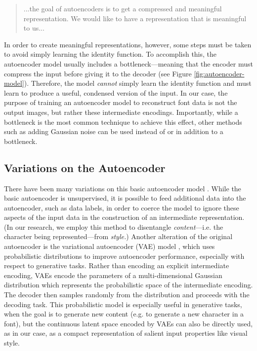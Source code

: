 \begin{quote}
    ...the goal of autoencoders is to get a compressed and meaningful
    representation. We would like to have a representation that is meaningful to us...
\end{quote}

In order to create meaningful representations, however, some steps must be taken to avoid simply learning the identity function. To accomplish this, the autoencoder model usually includes a bottleneck---meaning that the encoder must compress the input before giving it to the decoder (see Figure \ref{fig:autoencoder-model}). Therefore, the model \emph{cannot} simply learn the identity function and must learn to produce a useful, condensed version of the input. In our case, the purpose of training an autoencoder model to reconstruct font data is not the output images, but rather these intermediate encodings. Importantly, while a bottleneck is the most common technique to achieve this effect, other methods such as adding Gaussian noise \cite{bank2021autoencoders} can be used instead of or in addition to a bottleneck.

\subsection{Variations on the Autoencoder}

There have been many variations on this basic autoencoder model \cite{michelucci2022}. While the basic autoencoder is unsupervised, it is possible to feed additional data into the autoencoder, such as data labels, in order to coerce the model to ignore these aspects of the input data in the construction of an intermediate representation. (In our research, we employ this method to disentangle \textit{content}---i.e. the character being represented---from \textit{style.}) Another alteration of the original autoencoder is the variational autoencoder (VAE) model \cite{kingma2013}, which uses probabilistic distributions to improve autoencoder performance, especially with respect to generative tasks. Rather than encoding an explicit intermediate encoding, VAEs encode the parameters of a multi-dimensional Gaussian distribution which represents the probabilistic space of the intermediate encoding. The decoder then samples randomly from the distribution and proceeds with the decoding task. This probabilistic model is especially useful in generative tasks, when the goal is to generate new content (e.g. to generate a new character in a font), but the continuous latent space encoded by VAEs can also be directly used, as in our case, as a compact representation of salient input properties like visual style.

